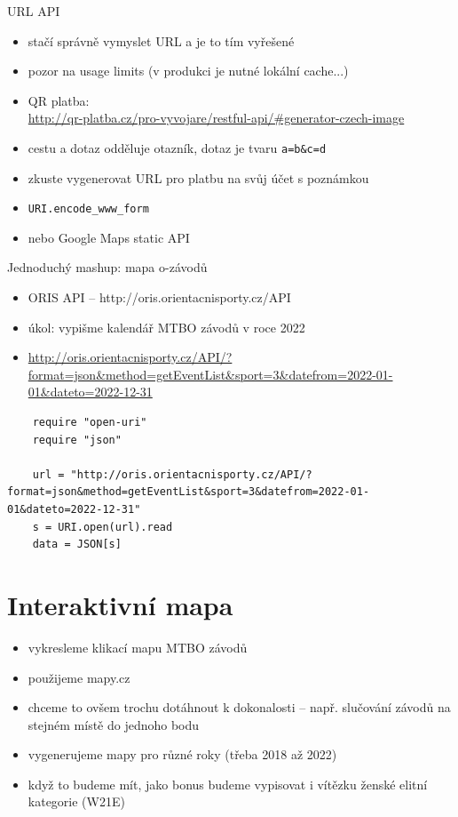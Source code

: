 \documentclass{beamer}
\begin{document}
\begin{frame}{URL API}
  \begin{itemize}
    \item stačí správně vymyslet URL a je to tím vyřešené
    \item pozor na usage limits (v produkci je nutné lokální cache...)
    \item QR platba: \\
    {\tiny \url{http://qr-platba.cz/pro-vyvojare/restful-api/\#generator-czech-image}}
    \item cestu a dotaz odděluje otazník, dotaz je tvaru \texttt{a=b\&c=d}
    \item zkuste vygenerovat URL pro platbu na svůj účet s poznámkou
    \item \texttt{URI.encode\_www\_form}
    \item nebo Google Maps static API
  \end{itemize}
\end{frame}

\begin{frame}[containsverbatim]{Jednoduchý mashup: mapa o-závodů}
  \begin{itemize}
    \item ORIS API -- http://oris.orientacnisporty.cz/API
    \item úkol: vypišme kalendář MTBO závodů v roce 2022
    \item {\tiny \url{http://oris.orientacnisporty.cz/API/?format=json\&method=getEventList\&sport=3\&datefrom=2022-01-01\&dateto=2022-12-31}}
  \end{itemize}

  \begin{verbatim}
    require "open-uri"
    require "json"

    url = "http://oris.orientacnisporty.cz/API/?format=json&method=getEventList&sport=3&datefrom=2022-01-01&dateto=2022-12-31"
    s = URI.open(url).read
    data = JSON[s]
  \end{verbatim}
\end{frame}

\section{Interaktivní mapa}

\begin{frame}{}
  \begin{itemize}
    \item vykresleme klikací mapu MTBO závodů
    \item použijeme mapy.cz
    \item chceme to ovšem trochu dotáhnout k dokonalosti – např. slučování závodů na stejném místě do jednoho bodu
    \item vygenerujeme mapy pro různé roky (třeba 2018 až 2022)
    \item když to budeme mít, jako bonus budeme vypisovat i vítězku ženské elitní kategorie (W21E)
  \end{itemize}
\end{frame}
\end{document}
